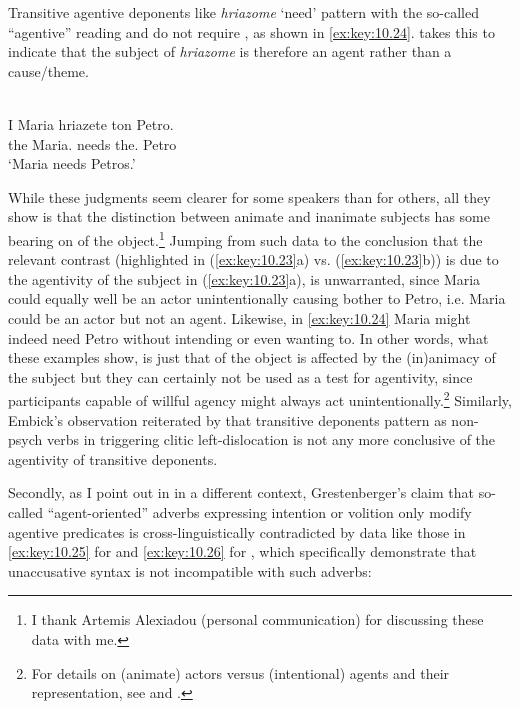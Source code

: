 \documentclass[output=paper]{langsci/langscibook}
\begin{document}
Transitive agentive deponents like \emph{hriazome} ‘need’ pattern with the
so-called “agentive” reading and do not require , as shown in
\eqref{ex:key:10.24}. \citeauthor{Grestenberger2014} takes this to indicate that the subject of
\emph{hriazome} is therefore an agent rather than a cause/theme.

\ea\label{ex:key:10.24} \\
    \gll    I    Maria    hriazete  ton  Petro.\\
            the  Maria.\Nom{}  needs the.\Acc{}  Petro\\
    \glt    ‘Maria needs Petros.’
\z

While these judgments seem clearer for some  speakers than for others, all
they show is that the distinction between animate and inanimate subjects has
some bearing on  of the object.\footnote{I thank Artemis
Alexiadou (personal communication) for discussing these data with me.} Jumping
from such data to the conclusion that the relevant contrast (highlighted in
(\ref{ex:key:10.23}a) vs. (\ref{ex:key:10.23}b)) is due to the agentivity of
the subject in (\ref{ex:key:10.23}a), is unwarranted, since Maria could equally
well be an actor unintentionally causing bother to Petro, i.e. Maria could be
an actor but not an agent. Likewise, in \eqref{ex:key:10.24} Maria might indeed
need Petro without intending or even wanting to. In other words, what these
examples show, is just that  of the object is affected by the
(in)animacy of the subject but they can certainly not be used as a test for
agentivity, since participants capable of willful agency might always act
unintentionally.\footnote{For details on (animate) actors versus (intentional)
agents and their representation, see \citet{Demirdache1997} and
\textcite{Kallulli2006b,Kallulli2007}.}  Similarly, Embick’s observation
reiterated by \citeauthor{Grestenberger2014} that transitive deponents pattern as non-psych
verbs in triggering clitic left-dislocation is not
any more conclusive of the agentivity of transitive deponents.

Secondly, as I point out in \citet{Kallulli2007} in a different context,
Grestenberger’s claim that so-called “agent-oriented” adverbs expressing
intention or volition only modify agentive predicates is cross-linguistically
contradicted by data like those in \eqref{ex:key:10.25} for  and
\eqref{ex:key:10.26} for , which specifically demonstrate that
unaccusative
syntax is not incompatible with such adverbs:
\end{document}
